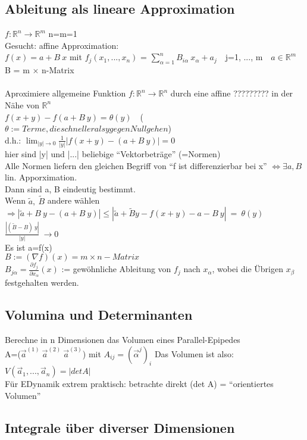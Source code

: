 \documentclass{article}
\begin{document}
\subsection{Ableitung als lineare Approximation}
$f: \mathbb{R}^n \rightarrow \mathbb{R}^m$ n=m=1 \\
Gesucht: affine Approximation:\\
$f(x) = a + B ~ x$ mit $f_j (x_1, ..., x_n)$  = $\sum_{\alpha = 1}^n B_{i \alpha} ~ x_\alpha + a_j ~~~$ j=1, ..., m $~~~ a \in \mathbb{R}^m~~~$ B = m $\times$ n-Matrix\\\\
Aproximiere allgemeine Funktion $f: \mathbb{R}^n \rightarrow \mathbb{R}^n$ durch eine affine ????????? in der Nähe von $\mathbb{R}^n$ \\
$f(x+y) - f(a+B~y) = \theta(y)~~~$ ($\theta := Terme, die schneller als y gegen Null gehen$)\\
d.h.: $\lim_{|y| \rightarrow 0} \frac{1}{|y|} |f(x+y) - (a+B~y)|=0 $\\
hier sind |y| und |...| beliebige ``Vektorbeträge'' (=Normen)\\
Alle Normen liefern den gleichen Begriff von ``f ist differenzierbar bei x'' $\Leftrightarrow \exists a, B $ lin. Apporximation.\\
Dann sind a, B eindeutig bestimmt. \\
Wenn $\tilde{a},~\tilde{B}$ andere wählen $\Rightarrow |\tilde{a} + B~y - (a+B~y)| \leq |\tilde{a}+\tilde{B}y - f(x+y)-a-B~y| ~=~ \theta(y)$\\
$\frac{|(\tilde{B} - B) ~ y|}{|y|} ~ \rightarrow 0$\\
Es ist a=f(x)\\
$B:=(\nabla f)(x) = m \times n-Matrix$\\
$B_{j\alpha} = \frac{\partial f_j}{\partial x_\alpha}(x)$ := gewöhnliche Ableitung von $f_j$ nach $x_\alpha$, wobei die Übrigen $x_\beta$ festgehalten werden.

\subsection{Volumina und Determinanten}
Berechne in n Dimensionen das Volumen eines Parallel-Epipedes\\
A=($\vec a^{(1)} ~ \vec a^{(2)} ~ \vec a^{(3)}$) mit $A_{ij} = (\vec \alpha^j)_i$ Das Volumen ist also: $V(\vec a_1, ..., \vec a_n) = |det A|$\\
Für EDynamik extrem praktisch: betrachte direkt (det A) = ``orientiertes Volumen''
\subsection{Integrale über diverser Dimensionen}
\end{document}
